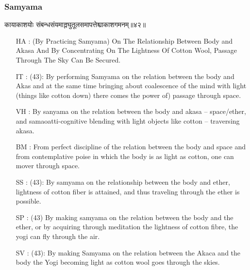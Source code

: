 \begin{frame}[fragile]\frametitle{Samyama}
\begin{sanskrit}
कायाकाशयोः संबन्धसंयमाल्लघुतूलसमापत्तेश्चाकाशगमनम्॥४२॥
\end{sanskrit}

	\begin{itemize}
	\item [HA]: (By Practicing Samyama) On The Relationship Between Body and Akasa And By Concentrating On The Lightness Of Cotton Wool, Passage Through The Sky Can Be Secured.
	\item [IT]: (43): By performing Samyama on the relation between the body and Akas and at the same time bringing about coalescence of the mind with light (things like cotton down) there comes the power of) passage through space.
	\item [VH]: By sanyama on the relation between the body and akasa – space/ether, and samaoatti-cognitive blending with light objects like cotton – traversing akasa.
	\item [BM]: From perfect discipline of the relation between the body and space and from contemplative poise in which the body is as light as cotton, one can mover through space.
	\item [SS]: (43): By samyama on the relationship between the body and ether, lightness of cotton fiber is attained, and thus traveling through the ether is possible.
	\item [SP]: (43) By making samyama on the relation between the body and the ether, or by acquiring through meditation the lightness of cotton fibre, the yogi can fly through the air.
	\item [SV]: (43): By making Samyama on the relation between the Akaca and the body the Yogi becoming light as cotton wool goes through the skies.
	\end{itemize}
\end{frame}

